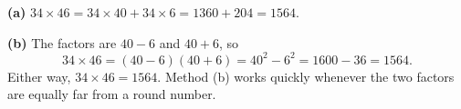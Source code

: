 \textbf{(a)} $34\times46=34\times40+34\times6=1360+204=1564$.

\textbf{(b)} The factors are $40-6$ and $40+6$, so
\[34\times46=(40-6)(40+6)=40^2-6^2=1600-36=1564 .\]
Either way, $34\times46=\boxed{1564}$. Method (b) works quickly whenever the two factors are equally far from a round number.
